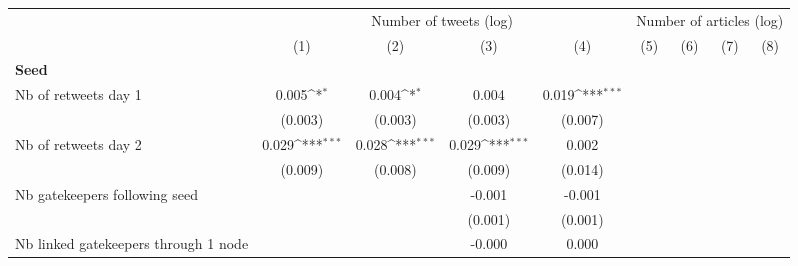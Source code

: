 {
\def\sym#1{\ifmmode^{#1}\else\(^{#1}\)\fi}
\begin{tabular}{l*{8}{c}}
\hline\hline
                    &\multicolumn{4}{c}{Number of tweets (log)}                                             &\multicolumn{4}{c}{Number of articles (log)}                                           \\\cmidrule(lr){2-5}\cmidrule(lr){6-9}
                    &\multicolumn{1}{c}{(1)}         &\multicolumn{1}{c}{(2)}         &\multicolumn{1}{c}{(3)}         &\multicolumn{1}{c}{(4)}         &\multicolumn{1}{c}{(5)}         &\multicolumn{1}{c}{(6)}         &\multicolumn{1}{c}{(7)}         &\multicolumn{1}{c}{(8)}         \\
\hline
\textbf{Seed}       &                     &                     &                     &                     &                     &                     &                     &                     \\
Nb of retweets day 1&       0.005\sym{*}  &       0.004\sym{*}  &       0.004         &       0.019\sym{***}&                     &                     &                     &                     \\
                    &     (0.003)         &     (0.003)         &     (0.003)         &     (0.007)         &                     &                     &                     &                     \\
Nb of retweets day 2&       0.029\sym{***}&       0.028\sym{***}&       0.029\sym{***}&       0.002         &                     &                     &                     &                     \\
                    &     (0.009)         &     (0.008)         &     (0.009)         &     (0.014)         &                     &                     &                     &                     \\
Nb gatekeepers following seed&                     &                     &      -0.001         &      -0.001         &                     &                     &                     &                     \\
                    &                     &                     &     (0.001)         &     (0.001)         &                     &                     &                     &                     \\
Nb linked gatekeepers through 1 node&                     &                     &      -0.000         &       0.000         &                     &                     &                     &                     \\

\end{tabular}}
